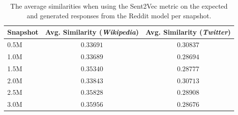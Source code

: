 \begin{table}[H]
	\centering
	\begin{adjustbox}{max width=\textwidth}
		\begin{tabular}{lcc}
			\toprule
			Snapshot & Avg. Similarity (\emph{Wikipedia}) & Avg. Similarity (\emph{Twitter})\\
			\midrule
			0.5M & $0.33691$ & $0.30837$\\
			1.0M & $0.33689$ & $0.28694$\\
			1.5M & $0.35340$ & $0.28777$\\
			2.0M & $0.33843$ & $0.30713$\\
			2.5M & $0.35828$ & $0.28908$\\
			3.0M & $0.35956$ & $0.28676$\\
			\bottomrule
		\end{tabular}
	\end{adjustbox}
	\caption{The average similarities when using the Sent2Vec metric on the expected and generated responses from the Reddit model per snapshot.}
	\label{results:sent2vec:reddit:results_table}
\end{table}

